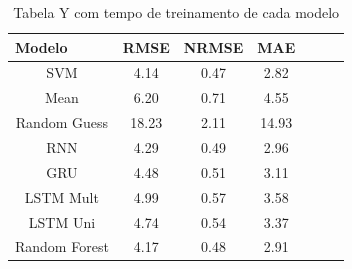 \begin{table}[H]
    \caption{Tabela Y com tempo de treinamento de cada modelo}
    \label{table:RmseComparison}
    \begin{center}
    \begin{tabular}{ccccccc}
    \hline
    \multicolumn{1}{l}{\textbf{Modelo}} & \multicolumn{1}{l}{\textbf{RMSE}} & \multicolumn{1}{l}{\textbf{NRMSE}} & \multicolumn{1}{l}{\textbf{MAE}} \\
    \hline
    SVM & 4.14 & 0.47 & 2.82  \\
    Mean & 6.20 & 0.71 & 4.55 \\
    Random Guess & 18.23 & 2.11 & 14.93\\
    RNN & 4.29 & 0.49 & 2.96 \\ 
    GRU & 4.48 & 0.51 & 3.11  \\ 
    LSTM Mult & 4.99 &  0.57 & 3.58  \\ 
    LSTM Uni & 4.74 &  0.54 & 3.37  \\ 
    Random Forest & 4.17 & 0.48 & 2.91 \\
    \hline
    \end{tabular}
    \end{center}
\end{table}